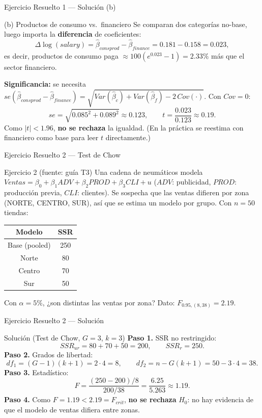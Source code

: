 \documentclass{beamer}
\begin{document}
\begin{frame}{Ejercicio Resuelto 1 — Solución (b)}
\begin{exampleblock}{(b) Productos de consumo vs.\ financiero}
Se comparan dos categorías no-base, luego importa la \textbf{diferencia} de coeficientes:
\[
\Delta\log(salary)=\hat\beta_{consprod}-\hat\beta_{finance}=0.181-0.158=0.023,
\]
es decir, productos de consumo paga $\approx 100(e^{0.023}-1)=2.33\%$ más que el sector financiero.

\textbf{Significancia:} se necesita $se(\hat\beta_{consprod}-\hat\beta_{finance})=\sqrt{Var(\hat\beta_{c})+Var(\hat\beta_{f})-2\,Cov(\cdot)}$. Con $Cov=0$:
\[
se=\sqrt{0.085^2+0.089^2}\approx 0.123,\qquad t=\frac{0.023}{0.123}\approx 0.19.
\]
Como $|t|<1.96$, \textbf{no se rechaza} la igualdad. (En la práctica se reestima con financiero como base para leer $t$ directamente.)
\end{exampleblock}
\end{frame}

\begin{frame}{Ejercicio Resuelto 2 — Test de Chow}
\begin{block}{Ejercicio 2 (fuente: guía T3)}
{\small Una cadena de neumáticos modela $Ventas=\beta_0+\beta_1 ADV+\beta_2 PROD+\beta_3 CLI+u$ ($ADV$: publicidad, $PROD$: producción previa, $CLI$: clientes). Se sospecha que las ventas difieren por zona (NORTE, CENTRO, SUR), así que se estima un modelo por grupo. Con $n=50$ tiendas:}
\begin{center}\small
\begin{tabular}{|c|c|}\hline
Modelo & SSR \\ \hline
Base (pooled) & 250 \\ \hline
Norte & 80 \\ \hline
Centro & 70 \\ \hline
Sur & 50 \\ \hline
\end{tabular}
\end{center}
{\small Con $\alpha=5\%$, ¿son distintas las ventas por zona? Dato: $F_{0.95,(8,38)}=2.19$.}
\end{block}
\end{frame}

\begin{frame}{Ejercicio Resuelto 2 — Solución}
\begin{exampleblock}{Solución (Test de Chow, $G=3$, $k=3$)}
\textbf{Paso 1.} SSR no restringido:
\[
SSR_{ur}=80+70+50=200,\qquad SSR_r=250.
\]
\textbf{Paso 2.} Grados de libertad:
\[
df_1=(G-1)(k+1)=2\cdot4=8,\qquad df_2=n-G(k+1)=50-3\cdot4=38.
\]
\textbf{Paso 3.} Estadístico:
\[
F=\frac{(250-200)/8}{200/38}=\frac{6.25}{5.263}\approx 1.19.
\]
\textbf{Paso 4.} Como $F=1.19 < 2.19 = F_{crit}$, \textbf{no se rechaza} $H_0$: no hay evidencia de que el modelo de ventas difiera entre zonas.
\end{exampleblock}
\end{frame}
\end{document}
